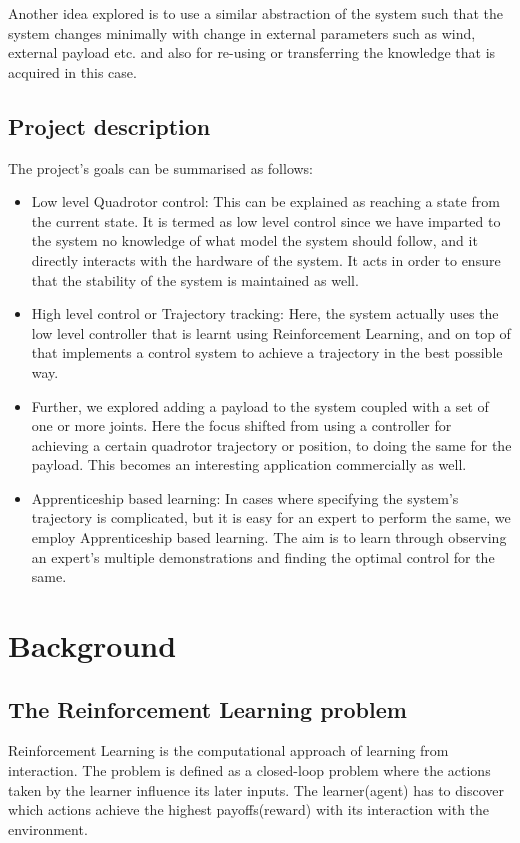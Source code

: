 \documentclass[hidelinks,BTech]{iitmdiss}
\begin{document}
Another idea explored is to use a similar abstraction of the system such that the system changes minimally with change in external parameters such as wind, external payload etc. and also for re-using or transferring the knowledge that is acquired in this case. 

\section{Project description}
The project's goals can be summarised as follows:
\begin{itemize}
	\item {Low level Quadrotor control: This can be explained as reaching a state from the current state. It is termed as low level control since we have imparted to the system no knowledge of what model the system should follow, and it directly interacts with the hardware of the system. It acts in order to ensure that the stability of the system is maintained as well.}
	\item {High level control or Trajectory tracking: Here, the system actually uses the low level controller that is learnt using Reinforcement Learning, and on top of that implements a control system to achieve a trajectory in the best possible way.}
	\item {Further, we explored adding a payload to the system coupled with a set of one or more joints. Here the focus shifted from using a controller for achieving a certain quadrotor trajectory or position, to doing the same for the payload. This becomes an interesting application commercially as well.}
	\item {Apprenticeship based learning: In cases where specifying the system's trajectory is complicated, but it is easy for an expert to perform the same, we employ Apprenticeship based learning. The aim is to learn through observing an expert's multiple demonstrations and finding the optimal control for the same.}
\end{itemize}

\chapter{Background}
\section {The Reinforcement Learning problem}
Reinforcement Learning is the computational approach of learning from interaction. The problem is defined as a closed-loop problem where the actions taken by the learner influence its later inputs. The learner(agent) has to discover which actions achieve the highest payoffs(reward) with its interaction with the environment. 
\end{document}
